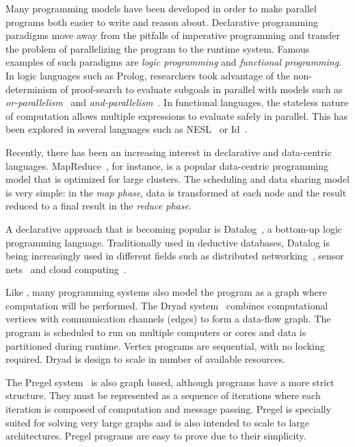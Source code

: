 
Many programming models have been developed in order to make parallel programs both easier to write and reason about. 
Declarative programming paradigms move away from the pitfalls of imperative programming and transfer the problem of parallelizing
the program to the runtime system. Famous examples of such paradigms are \emph{logic programming} and \emph{functional programming}.
In logic languages such as Prolog, researchers took advantage of the non-determinism of proof-search to evaluate subgoals
in parallel with models such as \emph{or-parallelism}~\cite{ali-86} and \emph{and-parallelism}~\cite{Shen-92}.
In functional languages, the stateless nature of computation allows multiple expressions to evaluate safely in parallel.
This has been explored in several languages such as NESL~\cite{Blelloch:1996:PPA:227234.227246} or Id~\cite{Nikhil93anoverview}.

Recently, there has been an increasing interest in declarative and data-centric languages.
MapReduce~\cite{Dean:2008:MSD:1327452.1327492}, for instance, is a popular data-centric programming
model that is optimized for large clusters. The scheduling and data sharing model is very simple:
in the \emph{map phase}, data is transformed at each node and the result reduced to a final
result in the \emph{reduce phase}.

A declarative approach that is becoming popular is Datalog~\cite{Ullman:1990:PDK:533142}, a
bottom-up logic programming language.
Traditionally used in deductive databases, Datalog is being increasingly used in different fields
such as distributed networking~\cite{Loo-condie-garofalakis-p2}, sensor
nets~\cite{Chu:2007:DID:1322263.1322281} and cloud computing~\cite{alvaro:boom}.

Like \lang, many programming systems also model the program as a graph where computation will be performed.
The Dryad system~\cite{Isard:2007:DDD:1272996.1273005} combines computational vertices
with communication channels (edges) to form a data-flow graph. The program is scheduled to
run on multiple computers or cores and data is partitioned during runtime. Vertex programs
are sequential, with no locking required. Dryad is design to scale in number of available resources.

The Pregel system~\cite{Malewicz:2010:PSL:1807167.1807184} is also graph based, although programs have a more strict
structure. They must be represented as a sequence of iterations where each iteration is composed of computation and message passing.
Pregel is specially suited for solving very large graphs
and is also intended to scale to large architectures. Pregel programs are easy to prove due to their simplicity.

